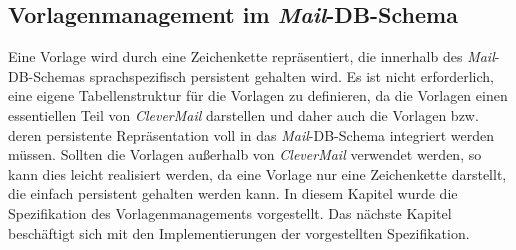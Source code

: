 \subsection{Vorlagenmanagement im \emph{Mail}-DB-Schema}
Eine Vorlage wird durch eine Zeichenkette repräsentiert, die innerhalb des \emph{Mail}-DB-Schemas sprachspezifisch  persistent gehalten wird. Es ist nicht erforderlich, eine eigene Tabellenstruktur für die Vorlagen zu definieren, da die Vorlagen einen essentiellen Teil von \emph{CleverMail} darstellen und daher auch die Vorlagen bzw. deren persistente Repräsentation voll in das \emph{Mail}-DB-Schema integriert werden müssen. 
\newline
\newline
Sollten die Vorlagen außerhalb von \emph{CleverMail} verwendet werden, so kann dies leicht realisiert werden, da eine Vorlage nur eine Zeichenkette darstellt, die einfach persistent gehalten werden kann.
\newline
\newline
In diesem Kapitel wurde die Spezifikation des Vorlagenmanagements vorgestellt. Das nächste Kapitel beschäftigt sich mit den Implementierungen der vorgestellten Spezifikation.